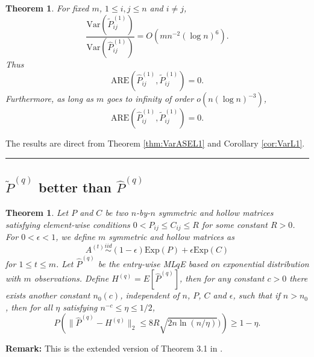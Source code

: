 \documentclass[a4paper]{article}
\newenvironment{proof}{{\bf Proof:  }}{\hfill\rule{2mm}{2mm}}
\newtheorem{theorem}[fact]{Theorem}
\begin{document}
\begin{theorem}
\label{thm:AREL1}
For fixed $m$, $1 \le i, j \le n$ and $i \ne j$,
\[
	\frac{\mathrm{Var}(\widetilde{P}_{ij}^{(1)})}{\mathrm{Var}(\hat{P}_{ij}^{(1)})}
    = O(m n^{-2} (\log n)^6).
\]
Thus
\[
	\mathrm{ARE}(\hat{P}_{ij}^{(1)}, \widetilde{P}_{ij}^{(1)}) = 0.
\]
Furthermore, as long as $m$ goes to infinity of order $o(n(\log n)^{-3})$,
\[
	\mathrm{ARE}(\hat{P}_{ij}^{(1)}, \widetilde{P}_{ij}^{(1)}) = 0.
\]
\end{theorem}
\begin{proof}
The results are direct from Theorem \ref{thm:VarASEL1} and Corollary \ref{cor:VarL1}.
\end{proof}



\subsection{$\widetilde{P}^{(q)}$ better than $\hat{P}^{(q)}$}


\begin{theorem}
\label{thm:PqDiff}
Let $P$ and $C$ be two $n$-by-$n$ symmetric and hollow matrices satisfying element-wise conditions $0 < P_{ij} \le C_{ij} \le R$ for some constant $R > 0$. For $0 < \epsilon < 1$, we define $m$ symmetric and hollow matrices as
\[
	A^{(t)} \stackrel{iid}{\sim} (1-\epsilon) \mathrm{Exp}(P) + \epsilon \mathrm{Exp}(C)
\]
for $1 \le t \le m$.
Let $\hat{P}^{(q)}$ be the entry-wise ML$q$E based on exponential distribution with $m$ observations.
Define $H^{(q)} = E[\hat{P}^{(q)}]$,
then for any constant $c > 0$ there exists another constant $n_0(c)$, independent of $n$, $P$, $C$ and $\epsilon$, such that if $n > n_0$, then for all $\eta$ satisfying $n^{-c} \le \eta \le 1/2$,
\[
	P \left( \| \hat{P}^{(q)} - H^{(q)} \|_2 \le 8 R \sqrt{2 n \ln(n/\eta)}) \right) \ge 1 - \eta.
\]
\end{theorem}
\textbf{Remark:} This is the extended version of Theorem 3.1 in \cite{oliveira2009concentration}.
\end{document}
